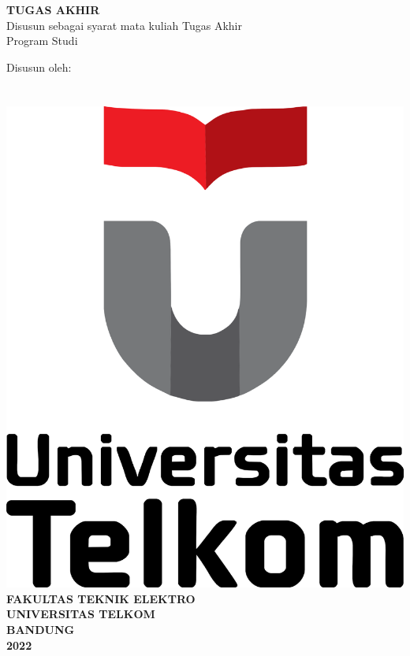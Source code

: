 \begin{titlepage}
	\begin{center}
	\thispagestyle{empty}
	\Large
	\textbf{\JUDUL}
	\bigskip
	
	\textbf{\textit{\JUDULENG}}
	\bigskip
	
	\normalsize
	\textbf{TUGAS AKHIR}\\
	Disusun sebagai syarat mata kuliah Tugas Akhir\\
	Program Studi \prodi
	
	\bigskip
	Disusun oleh:\\
	\textbf{\PENULIS}\\
	\textbf{\nim}\\
	\bigskip
	\bigskip
	\bigskip
	\includegraphics[scale=0.33]{./assets/logotelu.png}
	\vfill
	\Large
	\textbf{FAKULTAS TEKNIK ELEKTRO}\\
	\large
	\textbf{UNIVERSITAS TELKOM}\\
	\textbf{BANDUNG}\\
	\textbf{2022}
	\end{center} %
\end{titlepage}


